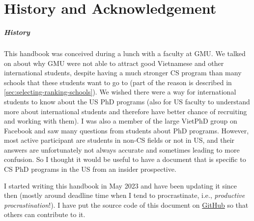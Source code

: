 \documentclass[oneside,11pt,dvipsnames]{book}
\newenvironment{commentbox}[1][]{
  \small
  \begin{mybox}
    {\small \textbf{#1}}
  }{
  \end{mybox}
}
\begin{document}





\chapter*{History and Acknowledgement}\label{sec:ack}

\paragraph{History} This handbook was conceived during a lunch with a faculty at GMU.  We talked on about why GMU were not able to attract good Vietnamese and other international students, despite having a much stronger CS program than many schools that these students want to go to (part of the reason is described in \autoref{sec:selecting-ranking-schools}). We wished there were a way for international students to know about the US PhD programs (also for US faculty to understand more about international students and therefore have better chance of recruiting and working with them). I was also a member of the large VietPhD group on Facebook and saw many questions from students about PhD programs.  However, most active participant are students in non-CS fields or not in US, and their answers are unfortunately not always accurate and sometimes leading to more confusion. So I thought it would be useful to have a document that is specific to CS PhD programs in the US from an insider prospective.

I started writing this handbook in May 2023 and have been updating it since then (mostly around deadline time when I tend to procrastinate, i.e., \emph{productive procrastination}!). I have put the source code of this document on \href{https://github.com/nguyenthanhvuh/phd-cs-us}{GitHub} so that others can contribute to it.
\end{document}
